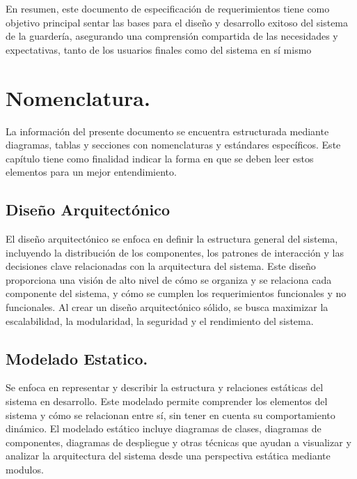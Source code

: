 En resumen, este documento de especificación de requerimientos tiene como objetivo principal sentar las bases para el diseño y desarrollo exitoso del sistema de la guardería, asegurando una comprensión compartida de las necesidades y expectativas, tanto de los usuarios finales como del sistema en sí mismo
	
\section{Nomenclatura.}

	La información del presente documento se encuentra estructurada mediante diagramas, tablas y secciones con nomenclaturas y estándares específicos. Este capítulo tiene como finalidad indicar la forma en que se deben leer estos elementos para un mejor entendimiento.


\subsection{Diseño Arquitectónico}
El diseño arquitectónico se enfoca en definir la estructura general del sistema, incluyendo la distribución de los componentes, los patrones de interacción y las decisiones clave relacionadas con la arquitectura del sistema. Este diseño proporciona una visión de alto nivel de cómo se organiza y se relaciona cada componente del sistema, y cómo se cumplen los requerimientos funcionales y no funcionales. Al crear un diseño arquitectónico sólido, se busca maximizar la escalabilidad, la modularidad, la seguridad y el rendimiento del sistema.

\subsection{ Modelado Estatico.}
Se enfoca en representar y describir la estructura y relaciones estáticas del sistema en desarrollo. Este modelado permite comprender los elementos del sistema y cómo se relacionan entre sí, sin tener en cuenta su comportamiento dinámico. El modelado estático incluye diagramas de clases, diagramas de componentes, diagramas de despliegue y otras técnicas que ayudan a visualizar y analizar la arquitectura del sistema desde una perspectiva estática mediante modulos.


